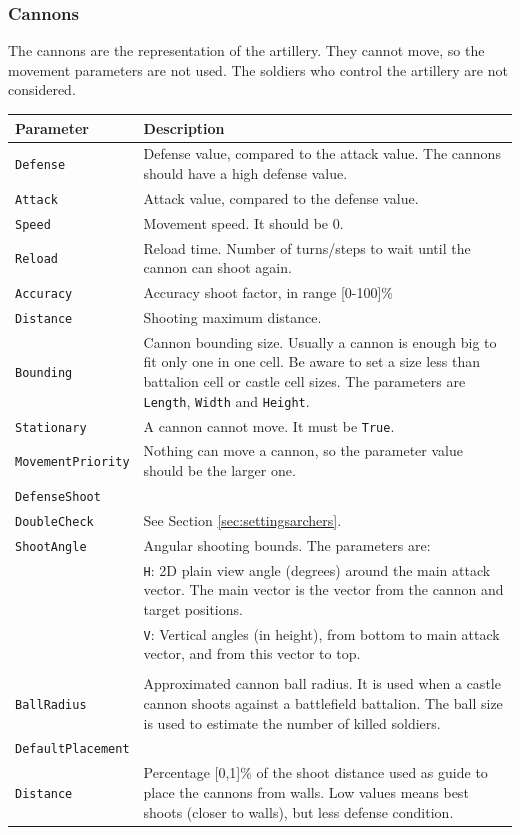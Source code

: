 \documentclass[tog]{acmsiggraph}
\begin{document}
\subsubsection{Cannons}
\label{sec:settingscannons}

The cannons are the representation of the artillery.
They cannot move, so the movement parameters are not used.
The soldiers who control the artillery are not considered.



\begin{tabularx}{0.48\textwidth}{ |X|X| }
\hline 
\textbf{Parameter} & \textbf{Description} \\[0.15cm]
 \hline
 \texttt{Defense} & Defense value, compared to the attack value. The cannons should have a high defense value. \\
 \hline
 \texttt{Attack} & Attack value, compared to the defense value. \\
 \hline
 \texttt{Speed} & Movement speed. It should be 0. \\
 \hline 
 \texttt{Reload} & Reload time. Number of turns/steps to wait until the cannon can shoot again. \\
 \hline 
 \texttt{Accuracy} & Accuracy shoot factor, in range [0-100]\% \\
 \hline 
 \texttt{Distance} & Shooting maximum distance.\\
 \hline 
 \texttt{Bounding} & Cannon bounding size. Usually a cannon is enough big to fit only one in one cell. Be aware to set a size less than battalion cell or castle cell sizes. The parameters are \texttt{Length}, \texttt{Width} and \texttt{Height}. \\
 \hline 
 \texttt{Stationary} & A cannon cannot move. It must be \texttt{True}. \\
 \hline 
 \texttt{MovementPriority} & Nothing can move a cannon, so the parameter value should be the larger one. \\
 \hline 
 \texttt{DefenseShoot} & \\
 \texttt{DoubleCheck} & See Section \ref{sec:settingsarchers}. \\
 \hline
 \texttt{ShootAngle} & Angular shooting bounds. The parameters are: \\
 & \quad\texttt{H}: 2D plain view angle (degrees) around the main attack vector. The main vector is the vector from the cannon and target positions.\\
 & \quad\texttt{V}: Vertical angles (in height), from bottom to main attack vector, and from this vector to top. \\
 & \\
 \hline
 \texttt{BallRadius} & Approximated cannon ball radius. It is used when a castle cannon shoots against a battlefield battalion. The ball size is used to estimate the number of killed soldiers. \\
 \hline
 \texttt{DefaultPlacement} & \\
 \texttt{Distance} & Percentage [0,1]\% of the shoot distance used as guide to place the cannons from walls. Low values means best shoots (closer to walls), but less defense condition. \\
 \hline
\end{tabularx} 
\end{document}
